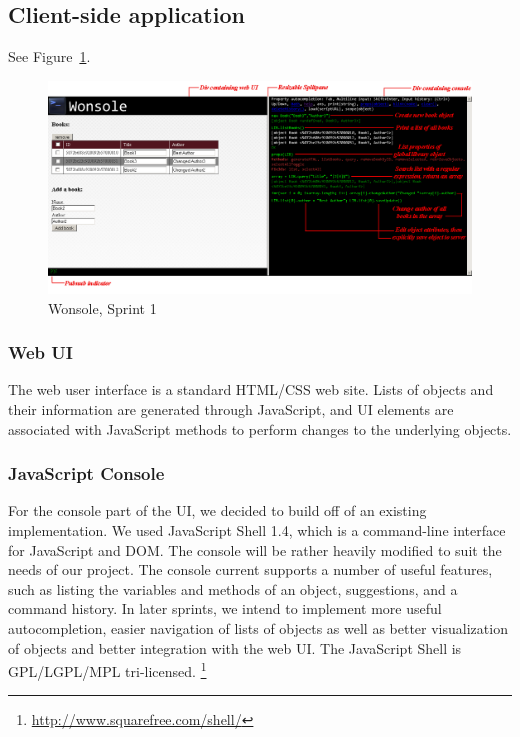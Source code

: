 \subsection{Client-side application}

See Figure~\ref{figure:Wonsole-Sprint1}.

\begin{figure}
\centering
\includegraphics[width=6in]{image/Wonsole-Sprint1.png}
\caption{Wonsole, Sprint 1}
\label{figure:Wonsole-Sprint1}
\end{figure}

\subsubsection{Web UI}
The web user interface is a standard HTML/CSS web site. Lists of objects and their information are generated through JavaScript, and UI elements are associated with JavaScript methods to perform changes to the underlying objects.

\subsubsection{JavaScript Console}
For the console part of the UI, we decided to build off of an existing implementation. We used JavaScript Shell 1.4, which is a command-line interface for JavaScript and DOM. The console will be rather heavily modified to suit the needs of our project. The console current supports a number of useful features, such as listing the variables and methods of an object, suggestions, and a command history. In later sprints, we intend to implement more useful autocompletion, easier navigation of lists of objects as well as better visualization of objects and better integration with the web UI. The JavaScript Shell is GPL/LGPL/MPL tri-licensed. 
\footnote{\url{http://www.squarefree.com/shell/}}

